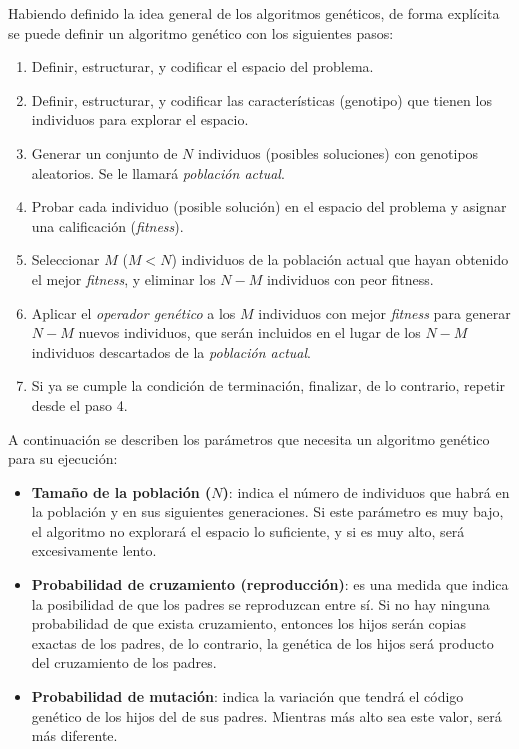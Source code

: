 \documentclass[a4paper, 12pt]{article}
\begin{document}
Habiendo definido la idea general de los algoritmos genéticos, de forma explícita se puede definir un algoritmo genético con los siguientes pasos:

\begin{enumerate}
    \item Definir, estructurar, y codificar el espacio del problema.
    \item Definir, estructurar, y codificar las características (genotipo) que tienen los individuos para explorar el espacio.
    \item Generar un conjunto de $N$ individuos (posibles soluciones) con genotipos aleatorios. Se le llamará \emph{población actual}.
    \item Probar cada individuo (posible solución) en el espacio del problema y asignar una calificación (\emph{fitness}).
    \item Seleccionar $M$ ($M < N$) individuos de la población actual que hayan obtenido el mejor \emph{fitness}, y eliminar los $N - M$ individuos con peor fitness.
    \item Aplicar el \emph{operador genético} a los $M$ individuos con mejor \emph{fitness} para generar $N - M$ nuevos individuos, que serán incluidos en el lugar de los $N - M$ individuos descartados de la \emph{población actual}.
    \item Si ya se cumple la condición de terminación, finalizar, de lo contrario, repetir desde el paso 4.
\end{enumerate}

A continuación se describen los parámetros que necesita un algoritmo genético para su ejecución:

\begin{itemize}
    \item \textbf{Tamaño de la población ($N$)}: indica el número de individuos que habrá en la población y en sus siguientes generaciones. Si este parámetro es muy bajo, el algoritmo no explorará el espacio lo suficiente, y si es muy alto, será excesivamente lento.
    \item \textbf{Probabilidad de cruzamiento (reproducción)}: es una medida que indica la posibilidad de que los padres se reproduzcan entre sí. Si no hay ninguna probabilidad de que exista cruzamiento, entonces los hijos serán copias exactas de los padres, de lo contrario, la genética de los hijos será producto del cruzamiento de los padres.
    \item \textbf{Probabilidad de mutación}: indica la variación que tendrá el código genético de los hijos del de sus padres. Mientras más alto sea este valor, será más diferente.
\end{itemize}
\end{document}
